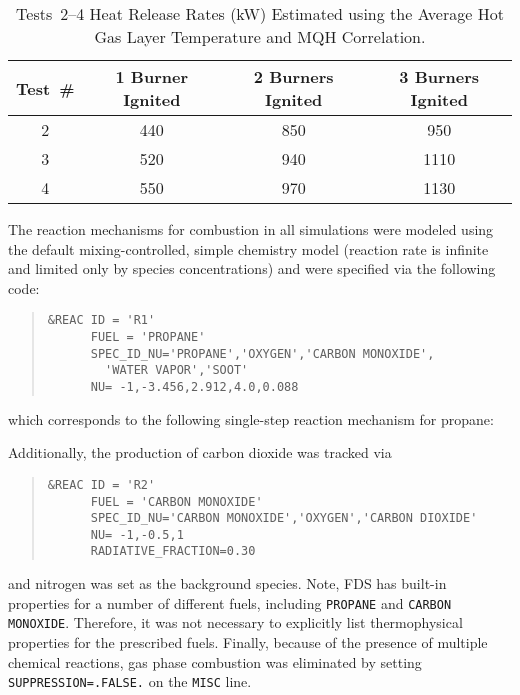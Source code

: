 \begin{table}[!ht]
\caption[Tests~2--4 Estimated Heat Release Rates Using MQH Correlation.]{Tests~2--4 Heat Release Rates (kW) Estimated using the Average Hot Gas Layer Temperature and MQH Correlation.}
\begin{center}
\begin{tabular}{cccc}
\toprule
\textbf{Test~\#} & \textbf{1 Burner Ignited} & \textbf{2 Burners Ignited} & \textbf{3 Burners Ignited}  \\
\midrule
2 & 440 & 850 & 950 \\
3 & 520 & 940 & 1110 \\
4 & 550 & 970 & 1130 \\
\hline
\end{tabular}
\end{center}
\label{table:test_over}
\end{table}
The reaction mechanisms for combustion in all simulations were modeled using the default mixing-controlled, simple chemistry model (reaction rate is infinite and limited only by species concentrations) and were specified via the following code:
\begin{quote}
\begin{verbatim}
&REAC ID = 'R1'
      FUEL = 'PROPANE'
      SPEC_ID_NU='PROPANE','OXYGEN','CARBON MONOXIDE',
        'WATER VAPOR','SOOT'
      NU= -1,-3.456,2.912,4.0,0.088 
\end{verbatim}
\end{quote}
\noindent which corresponds to the following single-step reaction mechanism for propane:
\begin{center}
\end{center}
Additionally, the production of carbon dioxide was tracked via
\begin{quote}
\begin{verbatim}
&REAC ID = 'R2'
      FUEL = 'CARBON MONOXIDE'
      SPEC_ID_NU='CARBON MONOXIDE','OXYGEN','CARBON DIOXIDE'
      NU= -1,-0.5,1
      RADIATIVE_FRACTION=0.30   
\end{verbatim}
\end{quote}
and nitrogen was set as the background species. Note, FDS has built-in properties for a number of different fuels, including \verb|PROPANE| and \verb|CARBON MONOXIDE|. Therefore, it was not necessary to explicitly list thermophysical properties for the prescribed fuels. Finally, because of the presence of multiple chemical reactions, gas phase combustion was eliminated by setting \verb|SUPPRESSION=.FALSE.| on the \verb|MISC| line.

